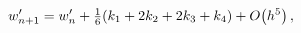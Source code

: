 \[w^{\prime}_{n+1}=w^{\prime}_{n}+\tfrac{1}{6}(k_{1}+2k_{2}+2k_{3}+k_{4})+%
\mathop{O\/}\nolimits\!\left(h^{5}\right),\]